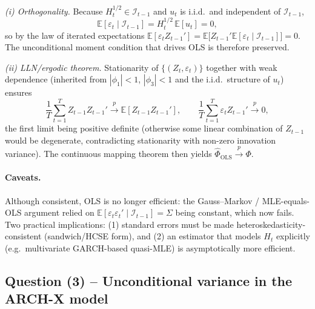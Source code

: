 \documentclass[12pt]{article}
\newcommand{\E}{\mathbb{E}}
\newcommand{\Info}{\mathcal{I}}
\begin{document}
\medskip
\textit{(i) Orthogonality.} Because $H_t^{1/2}\in\Info_{t-1}$ and $u_t$ is i.i.d.\ and independent of $\Info_{t-1}$,
\begin{equation*}
\E[\varepsilon_t\mid\Info_{t-1}] = H_t^{1/2}\,\E[u_t]=0,
\end{equation*}
so by the law of iterated expectations $\E[\varepsilon_t Z_{t-1}']=\E\!\big[Z_{t-1}'\E[\varepsilon_t\mid\Info_{t-1}]\big]=0$. The unconditional moment condition that drives OLS is therefore preserved.

\medskip
\textit{(ii) LLN/ergodic theorem.} Stationarity of $\{(Z_t,\varepsilon_t)\}$ together with weak dependence (inherited from $|\phi_1|<1$, $|\phi_3|<1$ and the i.i.d.\ structure of $u_t$) ensures
\begin{equation*}
\frac{1}{T}\sum_{t=1}^{T}Z_{t-1}Z_{t-1}'\xrightarrow{p}\E[Z_{t-1}Z_{t-1}'],\qquad
\frac{1}{T}\sum_{t=1}^{T}\varepsilon_t Z_{t-1}'\xrightarrow{p}0,
\end{equation*}
the first limit being positive definite (otherwise some linear combination of $Z_{t-1}$ would be degenerate, contradicting stationarity with non-zero innovation variance). The continuous mapping theorem then yields $\widehat{\Phi}_{\text{OLS}}\xrightarrow{p}\Phi$.

\paragraph{Caveats.} Although consistent, OLS is no longer efficient: the Gauss--Markov / MLE-equals-OLS argument relied on $\E[\varepsilon_t\varepsilon_t'\mid\Info_{t-1}]=\Sigma$ being constant, which now fails. Two practical implications: (1) standard errors must be made heteroskedasticity-consistent (sandwich/HCSE form), and (2) an estimator that models $H_t$ explicitly (e.g.\ multivariate GARCH-based quasi-MLE) is asymptotically more efficient.

\subsection*{Question (3) -- Unconditional variance in the ARCH-X model}\label{sec:p3-q3}
\end{document}
